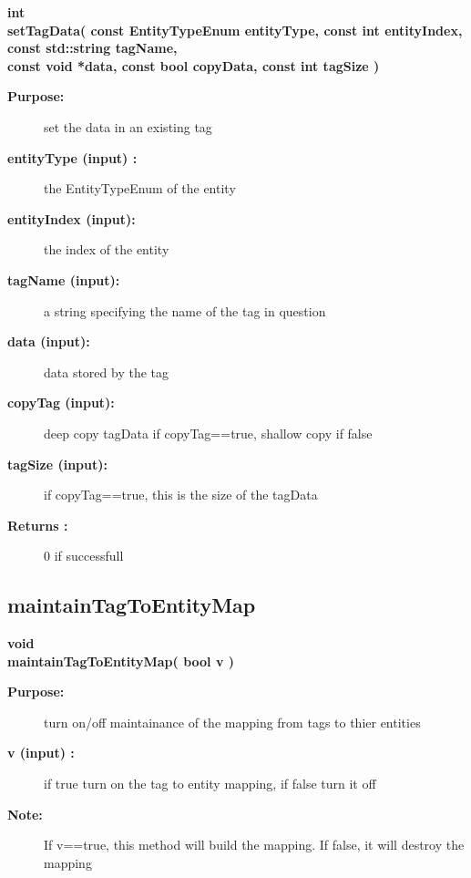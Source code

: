 \begin{flushleft} \textbf{%
int  \\ 
\settowidth{\UnstructuredMappingIncludeArgIndent}{setTagData(}%
setTagData( const  EntityTypeEnum entityType, const int entityIndex, \\ 
\hspace{\UnstructuredMappingIncludeArgIndent}const std::string tagName, \\ 
\hspace{\UnstructuredMappingIncludeArgIndent}const void *data, const bool copyData, const int tagSize )
}\end{flushleft}
\begin{description}
\item[{\bf Purpose:}]  
    set the data in an existing tag
\item[{\bf entityType (input) :}]  the EntityTypeEnum of the entity
\item[{\bf entityIndex (input):}]  the index of the entity
\item[{\bf tagName    (input):}]  a string specifying the name of the tag in question
\item[{\bf data    (input):}]  data stored by the tag
\item[{\bf copyTag    (input):}]  deep copy tagData if copyTag==true, shallow copy if false
\item[{\bf tagSize    (input):}]  if copyTag==true, this is the size of the tagData
\item[{\bf Returns :}]  0 if successfull
\end{description}
\subsection{maintainTagToEntityMap}
 
\begin{flushleft} \textbf{%
void  \\ 
\settowidth{\UnstructuredMappingIncludeArgIndent}{maintainTagToEntityMap(}%
maintainTagToEntityMap( bool v )
}\end{flushleft}
\begin{description}
\item[{\bf Purpose:}]  
    turn on/off maintainance of the mapping from tags to thier entities
\item[{\bf v (input) :}]  if true turn on the tag to entity mapping, if false turn it off
\item[{\bf Note:}]  If v==true, this method will build the mapping.  If false, it will destroy the mapping
\end{description}
